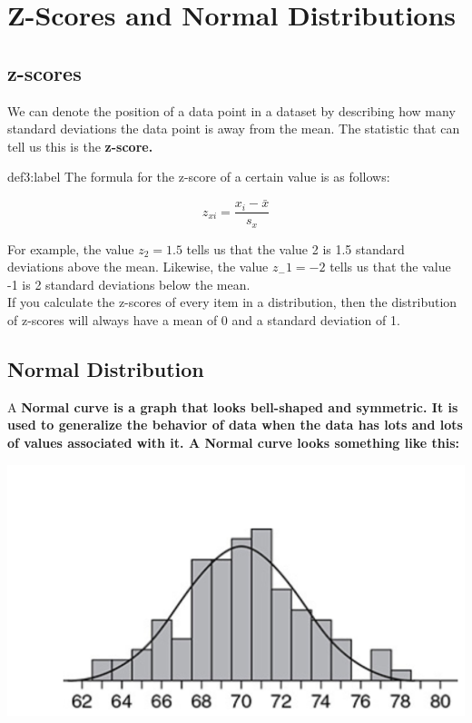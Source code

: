 \section{Z-Scores and Normal Distributions}

\subsection{z-scores}

We can denote the position of a data point in a dataset by describing how many standard deviations the data point is away from the mean. The statistic that can tell us this is the \bf{z-score}.

\begin{definition}{def3:label}
    The formula for the z-score of a certain value is as follows:

    $$
    z_{xi} = \frac{x_i - \bar{x}}{s_x}
    $$

    For example, the value $z_2 = 1.5$ tells us that the value 2 is 1.5 standard deviations above the mean. Likewise, the value $z_-1 = -2$ tells us that the value -1 is 2 standard deviations below the mean.\\

    If you calculate the z-scores of every item in a distribution, then the distribution of z-scores will always have a mean of 0 and a standard deviation of 1.
\end{definition}



\subsection{Normal Distribution}

A \bf{Normal curve} is a graph that looks bell-shaped and symmetric. It is used to generalize the behavior of data when the data has lots and lots of values associated with it. A Normal curve looks something like this: \newpage

\begin{center}
    \includegraphics[width=\textwidth]{chapters/unit1/images/fig1.1.PNG}
\end{center}

